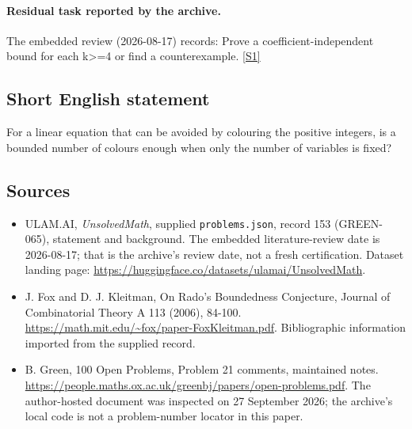 \documentclass[11pt,a4paper]{article}
\newcommand{\sref}[2]{\hyperlink{source:#1:#2}{[S#2]}}
\begin{document}
\paragraph{Residual task reported by the archive.}

The embedded review (2026-08-17) records: Prove a coefficient-independent bound for each k>=4 or find a counterexample. \sref{153}{1}

\subsection{Short English statement}

For a linear equation that can be avoided by colouring the positive integers, is a bounded number of colours enough when only the number of variables is fixed?

\subsection{Sources}

{\small

\begin{itemize}

\item[\hypertarget{source:153:1}{S1}] ULAM.AI, \emph{UnsolvedMath}, supplied \texttt{problems.json}, record 153 (GREEN-065), statement and background. The embedded literature-review date is 2026-08-17; that is the archive’s review date, not a fresh certification. Dataset landing page: \url{https://huggingface.co/datasets/ulamai/UnsolvedMath}.

\item[\hypertarget{source:153:2}{S2}] J. Fox and D. J. Kleitman, On Rado's Boundedness Conjecture, Journal of Combinatorial Theory A 113 (2006), 84-100. \url{https://math.mit.edu/~fox/paper-FoxKleitman.pdf}. Bibliographic information imported from the supplied record.

\item[\hypertarget{source:153:3}{S3}] B. Green, 100 Open Problems, Problem 21 comments, maintained notes. \url{https://people.maths.ox.ac.uk/greenbj/papers/open-problems.pdf}. The author-hosted document was inspected on 27 September 2026; the archive’s local code is not a problem-number locator in this paper.

\end{itemize}

}

\label{end:153}
\end{document}
